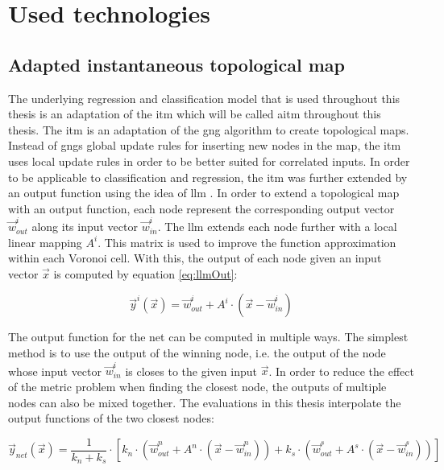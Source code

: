 \section{Used technologies \label{sec:technologies}}

\subsection{Adapted instantaneous topological map \label{sec:ITM}}
The underlying regression and classification model that is used throughout this thesis is an adaptation of the \acrfull{itm} which will be called \acrfull{aitm} throughout this thesis.
The \gls{itm} \cite{itm} is an adaptation of the \gls{gng} \cite{gng} algorithm to create topological maps. Instead of \glspl{gng} global update rules for inserting new nodes in the map, the \gls{itm} uses local update rules in order to be better suited for correlated inputs. 
In order to be applicable to classification and regression, the \gls{itm} was further extended by an output function using the idea of \gls{llm} \cite{LLM}. In order to extend a topological map with an output function, each node represent the corresponding output vector $\vec{w}^i_{out}$ along its input vector $\vec{w}^i_{in}$. The \gls{llm} extends each node further with a local linear mapping $A^i$. This matrix is used to improve the function approximation within each Voronoi cell. With this, the output of each node given an input vector $\vec{x}$ is computed by equation \ref{eq:llmOut}:

\begin{equation}
\vec{y}^i(\vec{x}) = \vec{w}^i_{out} + A^i \cdot (\vec{x}-\vec{w}^i_{in})
\label{eq:llmOut}
\end{equation}

The output function for the net can be computed in multiple ways. The simplest method is to use the output of the winning node, i.e. the output of the node whose input vector $\vec{w}^i_{in}$ is closes to the given input $\vec{x}$. In order to reduce the effect of the metric problem when finding the closest node, the outputs of multiple nodes can also be mixed together. The evaluations in this thesis interpolate the output functions of the two closest nodes:

\begin{equation}
\vec{y}_{net}(\vec{x}) =  \frac{1}{k_n+k_s} \cdot \left[ k_n \cdot \left(\vec{w}^n_{out} + A^n \cdot \left(\vec{x}-\vec{w}^n_{in}\right)\right) + k_s \cdot  \left(\vec{w}^s_{out} + A^s \cdot \left(\vec{x}-\vec{w}^s_{in}\right)\right)\right]
\end{equation}

